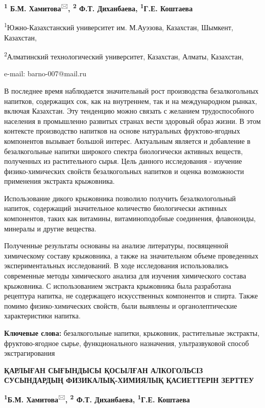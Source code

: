 {\bfseries \textsuperscript{1} Б.М. Хамитова}\textsuperscript{🖂}{\bfseries ,
\textsuperscript{2} Ф.Т. Диханбаева, \textsuperscript{1}Г.Е. Коштаева}

\textsuperscript{1}Южно-Казахстанский университет им. М.Ауэзова,
Казахстан, Шымкент, Казахстан,

\textsuperscript{2}Алматинский технологический университет, Казахстан,
Алматы, Казахстан,

e-mail: barno-007@mail.ru

В последнее время наблюдается значительный рост производства
безалкогольных напитков, содержащих сок, как на внутреннем, так и на
международном рынках, включая Казахстан. Эту тенденцию можно связать с
желанием трудоспособного населения в промышленно развитых странах вести
здоровый образ жизни. В этом контексте производство напитков на основе
натуральных фруктово-ягодных компонентов вызывает большой интерес.
Актуальным является и добавление в безалкогольные напитки широкого
спектра биологически активных веществ, полученных из растительного
сырья. Цель данного исследования - изучение физико-химических свойств
безалкогольных напитков и оценка возможности применения экстракта
крыжовника.

Использование дикого крыжовника позволило получить безалкологольный
напиток, содержащий значительное количество биологически активных
компонентов, таких как витамины, витаминоподобные соединения,
флавоноиды, минералы и другие вещества.

Полученные результаты основаны на анализе литературы, посвященной
химическому составу крыжовника, а также на значительном объеме
проведенных экспериментальных исследований. В ходе исследования
использовались современные методы химического анализа для изучения
химического состава крыжовника. С использованием экстракта крыжовника
была разработана рецептура напитка, не содержащего искусственных
компонентов и спирта. Также помимо физико-химических свойств, были
выявлены и органолептические характеристики напитка.

{\bfseries Ключевые слова:} безалкогольные напитки, крыжовник, растительные
экстракты, фруктово-ягодное сырье, функционального назначения,
ультразвуковой способ экстрагирования

{\bfseries ҚАРЛЫҒАН СЫҒЫНДЫСЫ ҚОСЫЛҒАН АЛКОГОЛЬСІЗ СУСЫНДАРДЫҢ
ФИЗИКАЛЫҚ-ХИМИЯЛЫҚ ҚАСИЕТТЕРІН ЗЕРТТЕУ}

{\bfseries \textsuperscript{1}Б.М. Хамитова}\textsuperscript{🖂}{\bfseries ,
\textsuperscript{2} Ф.Т. Диханбаева, \textsuperscript{1}Г.Е. Коштаева}

